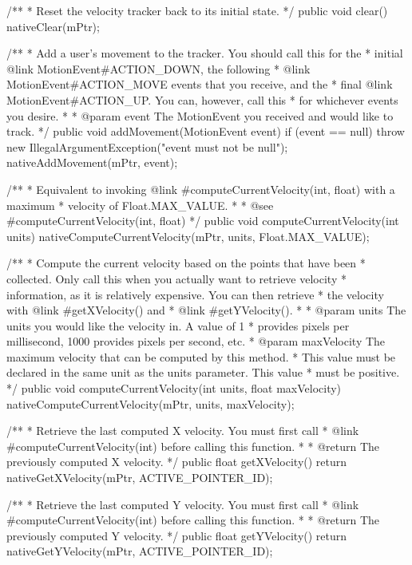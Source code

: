 {    /**
     * Reset the velocity tracker back to its initial state.
     */
    public void clear() {
        nativeClear(mPtr);
    }
    
    /**
     * Add a user's movement to the tracker.  You should call this for the
     * initial {@link MotionEvent#ACTION_DOWN}, the following
     * {@link MotionEvent#ACTION_MOVE} events that you receive, and the
     * final {@link MotionEvent#ACTION_UP}.  You can, however, call this
     * for whichever events you desire.
     * 
     * @param event The MotionEvent you received and would like to track.
     */
    public void addMovement(MotionEvent event) {
        if (event == null) {
            throw new IllegalArgumentException("event must not be null");
        }
        nativeAddMovement(mPtr, event);
    }

    /**
     * Equivalent to invoking {@link #computeCurrentVelocity(int, float)} with a maximum
     * velocity of Float.MAX_VALUE.
     * 
     * @see #computeCurrentVelocity(int, float) 
     */
    public void computeCurrentVelocity(int units) {
        nativeComputeCurrentVelocity(mPtr, units, Float.MAX_VALUE);
    }

    /**
     * Compute the current velocity based on the points that have been
     * collected.  Only call this when you actually want to retrieve velocity
     * information, as it is relatively expensive.  You can then retrieve
     * the velocity with {@link #getXVelocity()} and
     * {@link #getYVelocity()}.
     * 
     * @param units The units you would like the velocity in.  A value of 1
     * provides pixels per millisecond, 1000 provides pixels per second, etc.
     * @param maxVelocity The maximum velocity that can be computed by this method.
     * This value must be declared in the same unit as the units parameter. This value
     * must be positive.
     */
    public void computeCurrentVelocity(int units, float maxVelocity) {
        nativeComputeCurrentVelocity(mPtr, units, maxVelocity);
    }
    
    /**
     * Retrieve the last computed X velocity.  You must first call
     * {@link #computeCurrentVelocity(int)} before calling this function.
     * 
     * @return The previously computed X velocity.
     */
    public float getXVelocity() {
        return nativeGetXVelocity(mPtr, ACTIVE_POINTER_ID);
    }
    
    /**
     * Retrieve the last computed Y velocity.  You must first call
     * {@link #computeCurrentVelocity(int)} before calling this function.
     * 
     * @return The previously computed Y velocity.
     */
    public float getYVelocity() {
        return nativeGetYVelocity(mPtr, ACTIVE_POINTER_ID);
    }
    
}
